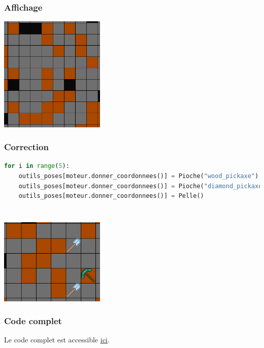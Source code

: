 \documentclass[svgnames,11pt]{beamer}
\begin{document}
\begin{frame}
    \frametitle{Affichage}

    \begin{center}
    \centering
    \includegraphics[width=5cm]{ressources/blocs.png}
    \label{IMG}
    \end{center}

\end{frame}
\begin{frame}[fragile]
    \frametitle{Correction}

    \begin{center}
    \begin{lstlisting}[language=Python , basicstyle=\small, xleftmargin=1.8em, xrightmargin=2em]
for i in range(5):
    outils_poses[moteur.donner_coordonnees()] = Pioche("wood_pickaxe")
    outils_poses[moteur.donner_coordonnees()] = Pioche("diamond_pickaxe")
    outils_poses[moteur.donner_coordonnees()] = Pelle()
      
\end{lstlisting}
    \label{CODE}
    \end{center}

\end{frame}
\begin{frame}
    \frametitle{}

    \begin{center}
    \centering
    \includegraphics[width=5cm]{ressources/outils.png}
    \label{IMG}
    \end{center}

\end{frame}
\begin{frame}
    \frametitle{Code complet}

    Le code complet est accessible \href{https://cviroulaud.github.io/terminale/langages/paradigmes/POO/minecraft/scripts/minecraft-corrige.zip}{ici}.

\end{frame}
\end{document}
